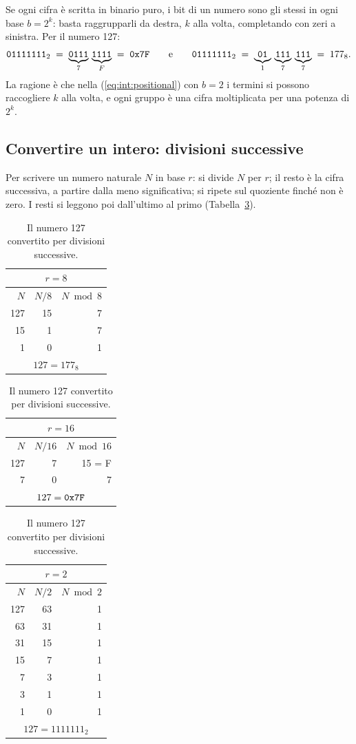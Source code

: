 Se ogni cifra è scritta in binario puro, i bit di un numero sono gli stessi in
ogni base $b=2^{k}$: basta raggrupparli da destra, $k$ alla volta, completando
con zeri a sinistra. Per il numero 127:
\[
\texttt{01111111}_2 \;=\; \underbrace{\texttt{0111}}_{7}\,\underbrace{\texttt{1111}}_{F}
 \;=\; \texttt{0x7F}
\qquad\text{e}\qquad
\texttt{01111111}_2 \;=\; \underbrace{\texttt{01}}_{1}\,\underbrace{\texttt{111}}_{7}\,\underbrace{\texttt{111}}_{7}
 \;=\; 177_8 .
\]
La ragione è che nella (\ref{eq:int:positional}) con $b=2$ i termini si possono
raccogliere $k$ alla volta, e ogni gruppo è una cifra moltiplicata per una
potenza di $2^{k}$.

\subsection{Convertire un intero: divisioni successive}

Per scrivere un numero naturale $N$ in base $r$: si divide $N$ per $r$; il
resto è la cifra successiva, a partire dalla meno significativa; si ripete sul
quoziente finché non è zero. I resti si leggono poi dall'ultimo al primo
(Tabella~\ref{tab:int:division}).

\begin{table}[htb]
\centering\small
\caption{Il numero 127 convertito per divisioni successive.}\label{tab:int:division}
\begin{tabular}{@{}rrr@{}}
\multicolumn{3}{c}{$r=8$}\\\toprule
$N$ & $N/8$ & $N \bmod 8$\\\midrule
127 & 15 & 7\\ 15 & 1 & 7\\ 1 & 0 & 1\\\bottomrule
\multicolumn{3}{c}{$127 = 177_8$}
\end{tabular}\qquad
\begin{tabular}{@{}rrr@{}}
\multicolumn{3}{c}{$r=16$}\\\toprule
$N$ & $N/16$ & $N \bmod 16$\\\midrule
127 & 7 & 15 = F\\ 7 & 0 & 7\\\bottomrule
\multicolumn{3}{c}{$127 = \texttt{0x7F}$}
\end{tabular}\qquad
\begin{tabular}{@{}rrr@{}}
\multicolumn{3}{c}{$r=2$}\\\toprule
$N$ & $N/2$ & $N \bmod 2$\\\midrule
127 & 63 & 1\\ 63 & 31 & 1\\ 31 & 15 & 1\\ 15 & 7 & 1\\ 7 & 3 & 1\\ 3 & 1 & 1\\ 1 & 0 & 1\\\bottomrule
\multicolumn{3}{c}{$127 = 1111111_2$}
\end{tabular}
\end{table}

